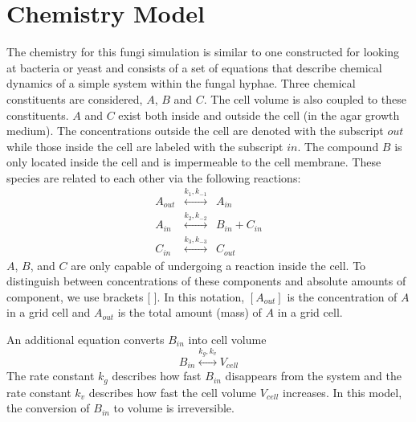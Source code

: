\documentclass[12pt]{article}
\begin{document}
\section{Chemistry Model}
The chemistry for this fungi simulation is similar to one constructed for looking
at bacteria or yeast and consists of a set
of equations that describe chemical dynamics of a simple system within
the fungal hyphae. Three chemical
constituents are considered, $A$, $B$
and $C$. The cell volume is also coupled to these constituents. $A$ and $C$
exist both inside and outside the cell (in the
agar growth medium). The concentrations outside the cell are denoted with the
subscript $out$ while those inside the cell are labeled
with the subscript $in$. The compound $B$ is only located inside the cell and
is impermeable to the cell membrane.
These species are related to each other via the following reactions:
\begin{eqnarray*}
A_{out} &\stackrel{k_{1},k_{-1}}{\longleftrightarrow}& A_{in} \\
A_{in} &\stackrel{k_2,k_{-2}}{\longleftrightarrow}& B_{in} + C_{in} \\
C_{in} &\stackrel{k_3,k_{-3}}{\longleftrightarrow}& C_{out}
\end{eqnarray*}
$A$, $B$, and $C$ are only capable of undergoing a reaction inside the cell.  To distinguish
between concentrations of these components and absolute amounts of component, we use
brackets [ ]. In this notation, $[A_{out}]$ is the concentration of $A$ in a grid cell and
$A_{out}$ is the total amount (mass) of $A$ in a grid cell.

An additional equation converts $B_{in}$ into cell volume
\[
B_{in} \stackrel{k_g,k_v}{\longleftrightarrow} V_{cell}
\]
The rate constant $k_g$ describes how fast $B_{in}$ disappears from the system
and the rate constant $k_v$ describes how fast the cell volume $V_{cell}$
increases. In this model, the conversion of $B_{in}$ to volume is irreversible.

\end{document}
